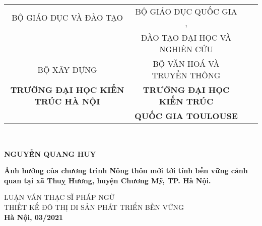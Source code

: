 \documentclass[../thesis.tex]{subfiles}
\begin{document}
\begin{titlepage}

\begin{center}
\begin{table}
\small
\centering
\begin{tabular}{c c r l}
BỘ GIÁO DỤC VÀ ĐÀO TẠO  &  BỘ GIÁO DỤC QUỐC GIA ,\\
 & ĐÀO TẠO ĐẠI HỌC VÀ NGHIÊN CỨU\\ 
BỘ XÂY DỰNG & BỘ VĂN HOÁ VÀ TRUYỀN THÔNG\\
\textbf{TRƯỜNG ĐẠI HỌC KIẾN TRÚC HÀ NỘI} & \textbf{TRƯỜNG ĐẠI HỌC KIẾN TRÚC}\\
& \textbf{QUỐC GIA TOULOUSE}
\end{tabular}
\\[2cm]
\end{table}

\textbf{NGUYỄN QUANG HUY\\[2cm]}


\textbf{\large Ảnh hưởng của chương trình Nông thôn mới tới tính bền vững cảnh quan tại xã Thuỵ Hương, huyện Chương Mỹ, TP. Hà Nội.  \\[2cm]}

LUẬN VĂN THẠC SĨ PHÁP NGỮ\\
THIẾT KẾ ĐÔ THỊ DI SẢN PHÁT TRIỂN BỀN VỮNG\\[8cm]


\textbf{Hà Nội, 03/2021}

\end{center}

\end{titlepage}
\end{document}
